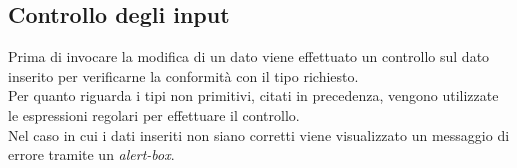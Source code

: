\subsection{Controllo degli input}
Prima di invocare la modifica di un dato viene effettuato un controllo sul dato inserito per verificarne la conformità con il tipo richiesto.\\
Per quanto riguarda i tipi non primitivi, citati in precedenza, vengono utilizzate le espressioni regolari per effettuare il controllo.\\
Nel caso in cui i dati inseriti non siano corretti viene visualizzato un messaggio di errore tramite un \textit{alert-box}.